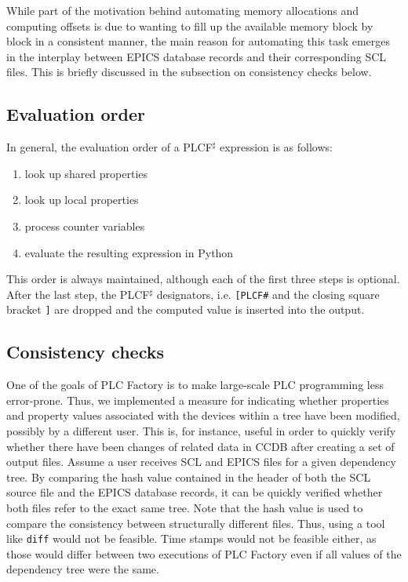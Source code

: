 \documentclass[a4paper,
              ]{jacow}
\begin{document}
While part of the motivation behind automating memory allocations and computing offsets is due to wanting to fill up the available memory block by block in a consistent manner, the main reason for automating this task emerges in the interplay between EPICS database records and their corresponding SCL files. This is briefly discussed in the subsection on consistency checks below.


\subsection{Evaluation order}

In general, the evaluation order of a PLCF$^\sharp$ expression is as follows:

\begin{enumerate}
\item look up shared properties
\item look up local properties
\item process counter variables
\item evaluate the resulting expression in Python
\end{enumerate}

This order is always maintained, although each of the first three steps is optional. After the last step, the PLCF$^\sharp$ designators, i.e. \texttt{[PLCF\#} and the closing square bracket \texttt{]} are dropped and the computed value is inserted into the output.

\subsection{Consistency checks}
One of the goals of PLC Factory is to make large-scale PLC programming less error-prone. Thus, we implemented a measure for indicating whether properties and property values associated with the devices within a tree have been modified, possibly by a different user. This is, for instance, useful in order to quickly verify whether there have been changes of related data in CCDB after creating a set of output files. Assume a user receives SCL and EPICS files for a given dependency tree. By comparing the hash value contained in the header of both the SCL source file and the EPICS database records, it can be quickly verified whether both files refer to the exact same tree. Note that the hash value is used to compare the consistency between structurally different files. Thus, using a tool like \texttt{diff} would not be feasible. Time stamps would not be feasible either, as those would differ between two executions of PLC Factory even if all values of the dependency tree were the same.
\end{document}
